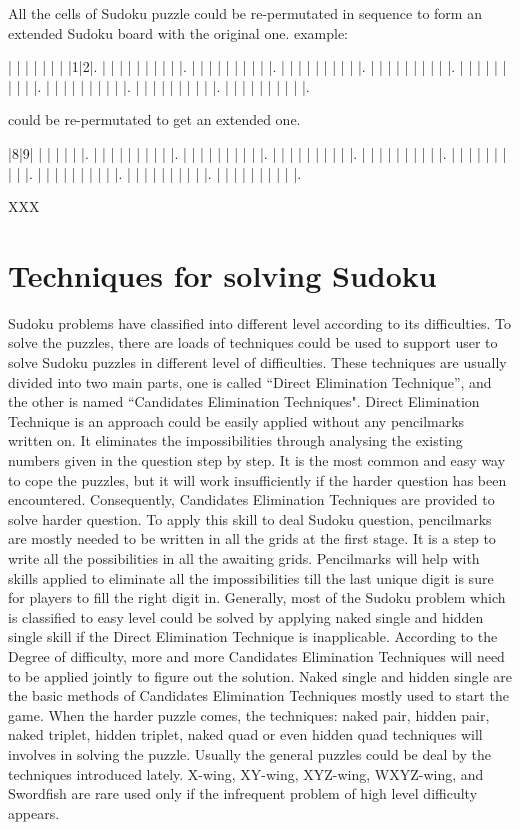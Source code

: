 \documentclass[11pt]{report}
\begin{document}
All the cells of Sudoku puzzle could be re-permutated in sequence to form an extended Sudoku board with the original one.
example:
\begin{sudoku}
   | | | | | | | |1|2|.
   | | | | | | | | | |.
   | | | | | | | | | |.
   | | | | | | | | | |.
   | | | | | | | | | |.
   | | | | | | | | | |.
   | | | | | | | | | |.
   | | | | | | | | | |.
   | | | | | | | | | |.
\end{sudoku}
could be re-permutated to get an extended one.
\begin{sudoku}
\label{p48}
   |8|9| | | | | | |.
   | | | | | | | | | |.
   | | | | | | | | | |.
   | | | | | | | | | |.
   | | | | | | | | | |.
   | | | | | | | | | |.
   | | | | | | | | | |.
   | | | | | | | | | |.
   | | | | | | | | | |.
\end{sudoku}

\cite{Berthier2007Sudoku} XXX

\chapter{Techniques for solving Sudoku}
\label{sec:Techniques}

Sudoku problems have classified into different level according to its difficulties. To solve the puzzles, there are loads of techniques could be used to support user to solve Sudoku puzzles in different level of difficulties.
These techniques are usually divided into two main parts, one is called “Direct Elimination Technique”, and the other is named “Candidates Elimination Techniques".
Direct Elimination Technique is an approach could be easily applied without any pencilmarks written on. It eliminates the impossibilities through analysing the existing numbers given in the question step by step. It is the most common and easy way to cope the puzzles, but it will work insufficiently if the harder question has been encountered. 
Consequently, Candidates Elimination Techniques are provided to solve harder question. To apply this skill to deal Sudoku question, pencilmarks are mostly needed to be written in all the grids at the first stage. It is a step to write all the possibilities in all the awaiting grids. Pencilmarks will help with skills applied to eliminate all the impossibilities till the last unique digit is sure for players to fill the right digit in.
Generally, most of the Sudoku problem which is classified to easy level could be solved by applying naked single and hidden single skill if the Direct Elimination Technique is inapplicable. According to the Degree of difficulty, more and more Candidates Elimination Techniques will need to be applied jointly to figure out the solution. 
Naked single and hidden single are the basic methods of Candidates Elimination Techniques mostly used to start the game. When the harder puzzle comes, the techniques: naked pair, hidden pair, naked triplet, hidden triplet, naked quad or even hidden quad techniques will involves in solving the puzzle. Usually the general puzzles could be deal by the techniques introduced lately. X-wing, XY-wing, XYZ-wing, WXYZ-wing, and Swordfish are rare used only if the infrequent problem of high level difficulty appears. 
\end{document}
